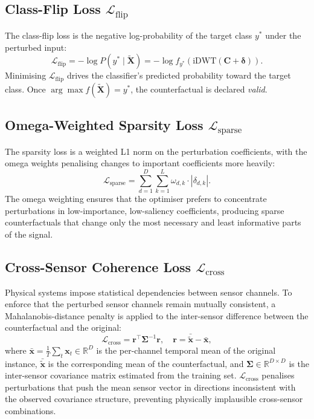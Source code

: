 \subsection{Class-Flip Loss $\mathcal{L}_{\text{flip}}$}

The class-flip loss is the negative log-probability of the target class $y^*$ under the perturbed input:
\begin{equation}
    \mathcal{L}_{\text{flip}} = -\log P\!\left(y^* \mid \widetilde{\mathbf{X}}\right) = -\log f_{y^*}\!\left(\text{iDWT}(\mathbf{C} + \boldsymbol{\delta})\right).
\end{equation}
Minimising $\mathcal{L}_{\text{flip}}$ drives the classifier's predicted probability toward the target class. Once $\arg\max f(\widetilde{\mathbf{X}}) = y^*$, the counterfactual is declared \emph{valid}.

\subsection{Omega-Weighted Sparsity Loss $\mathcal{L}_{\text{sparse}}$}

The sparsity loss is a weighted L1 norm on the perturbation coefficients, with the omega weights penalising changes to important coefficients more heavily:
\begin{equation}
    \mathcal{L}_{\text{sparse}} = \sum_{d=1}^{D} \sum_{k=1}^{L} \omega_{d,k} \cdot |\delta_{d,k}|.
\end{equation}
The omega weighting ensures that the optimiser prefers to concentrate perturbations in low-importance, low-saliency coefficients, producing sparse counterfactuals that change only the most necessary and least informative parts of the signal.

\subsection{Cross-Sensor Coherence Loss $\mathcal{L}_{\text{cross}}$}

Physical systems impose statistical dependencies between sensor channels. To enforce that the perturbed sensor channels remain mutually consistent, a Mahalanobis-distance penalty is applied to the inter-sensor difference between the counterfactual and the original:
\begin{equation}
    \mathcal{L}_{\text{cross}} = \mathbf{r}^\top \boldsymbol{\Sigma}^{-1} \mathbf{r}, \quad \mathbf{r} = \bar{\widetilde{\mathbf{x}}} - \bar{\mathbf{x}},
\end{equation}
where $\bar{\mathbf{x}} = \frac{1}{T}\sum_t \mathbf{x}_t \in \mathbb{R}^D$ is the per-channel temporal mean of the original instance, $\bar{\widetilde{\mathbf{x}}}$ is the corresponding mean of the counterfactual, and $\boldsymbol{\Sigma} \in \mathbb{R}^{D \times D}$ is the inter-sensor covariance matrix estimated from the training set. $\mathcal{L}_{\text{cross}}$ penalises perturbations that push the mean sensor vector in directions inconsistent with the observed covariance structure, preventing physically implausible cross-sensor combinations.

